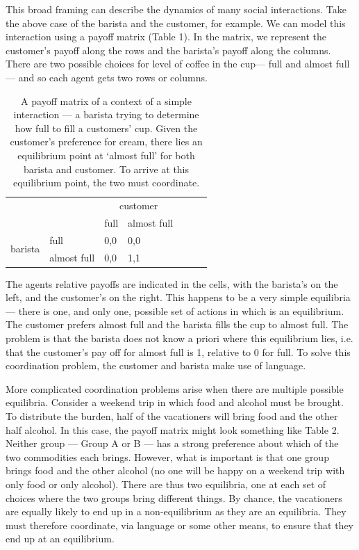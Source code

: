 \documentclass[man, noapacite, 12pt]{apa2}
\begin{document}
This broad framing can describe the dynamics of many social interactions. Take the above case of the barista and the customer, for example. We can model this interaction using a payoff matrix (Table 1). In the matrix, we represent the customer's payoff along the rows and the barista's payoff along the columns. There are two possible choices for  level of coffee in the cup---  full and  almost full --- and so each agent gets two rows or columns. 
\begin{table}[t]
\begin{center}
\begin{tabular}{l p{3cm} l p{3cm} l p{3cm} r}
 &  & \multicolumn{2}{c}{customer} \\ \cline{2-4} 
\multicolumn{1}{l|}{} & \multicolumn{1}{l|}{} & \multicolumn{1}{l|}{full} & \multicolumn{1}{l|}{almost full} \\ \cline{2-4} 
\multicolumn{1}{c|}{\multirow{2}{*}{barista}} & \multicolumn{1}{l|}{full} & \multicolumn{1}{l|}{0,0} & \multicolumn{1}{l|}{0,0} \\ \cline{2-4} 
\multicolumn{1}{c|}{} & \multicolumn{1}{l|}{almost full} & \multicolumn{1}{l|}{0,0} & \multicolumn{1}{l|}{1,1} \\ \cline{2-4} 
\end{tabular}
\caption{A payoff matrix of a context of a simple interaction --- a barista trying to determine how full to fill a customers' cup. Given the customer's preference for cream, there lies an equilibrium point at `almost full' for both barista and customer. To arrive at this equilibrium point, the two must coordinate.}
\end{center}
\end{table}
The agents relative payoffs are indicated in the cells, with the barista's on the left, and the customer's on the right. This happens to be a very simple equilibria --- there is one, and only one, possible set of actions in which is an equilibrium. The customer prefers almost full and the barista fills the cup to almost full. The problem is that the barista does not know a priori where this equilibrium lies, i.e. that the customer's pay off for almost full is 1, relative to 0 for full. To solve this coordination problem, the customer and barista make use of language.

More complicated coordination problems arise when there are multiple possible equilibria. Consider a weekend trip in which food and alcohol must be brought. To distribute the burden, half of the vacationers will bring food and the other half alcohol. In this case, the payoff matrix might look something like Table 2. Neither group --- Group A or B --- has a strong preference about which of the two commodities each brings. However, what is important is that one group brings food and the other alcohol (no one will be happy on a weekend trip with only food or only alcohol). There are thus two equilibria, one  at each set of choices where the two groups bring different things. By chance, the vacationers are equally likely to end up in a non-equilibrium as they are an equilibria. They must  therefore coordinate, via language or some other means, to ensure that they end up at an equilibrium.
\end{document}
